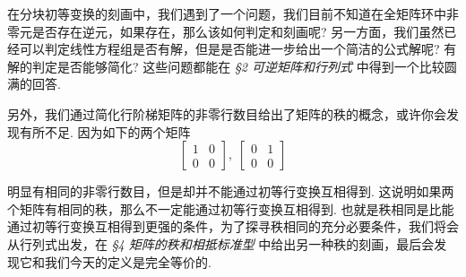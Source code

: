 \documentclass[10pt,openany]{article}
\theoremstyle{thmstyle} %
\theoremstyle{defstyle} %
\theoremstyle{prostyle} %
\theoremstyle{exastyle}
\theoremstyle{remstyle}
\begin{document}
在分块初等变换的刻画中，我们遇到了一个问题，我们目前不知道在全矩阵环中非零元是否存在逆元，如果存在，那么该如何判定和刻画呢? 另一方面，我们虽然已经可以判定线性方程组是否有解，但是是否能进一步给出一个简洁的公式解呢? 有解的判定是否能够简化? 这些问题都能在 \textit{\S 2 可逆矩阵和行列式} 中得到一个比较圆满的回答. 

另外，我们通过简化行阶梯矩阵的非零行数目给出了矩阵的秩的概念，或许你会发现有所不足. 因为如下的两个矩阵
\[ \begin{bmatrix}
	1 & 0 \\ 0 & 0
\end{bmatrix}, \; \begin{bmatrix}
0 & 1 \\ 0 & 0
\end{bmatrix} \]

明显有相同的非零行数目，但是却并不能通过初等行变换互相得到. 这说明如果两个矩阵有相同的秩，那么不一定能通过初等行变换互相得到. 也就是秩相同是比能通过初等行变换互相得到更强的条件，为了探寻秩相同的充分必要条件，我们将会从行列式出发，在 \textit{\S 4 矩阵的秩和相抵标准型} 中给出另一种秩的刻画，最后会发现它和我们今天的定义是完全等价的. 
\end{document}
